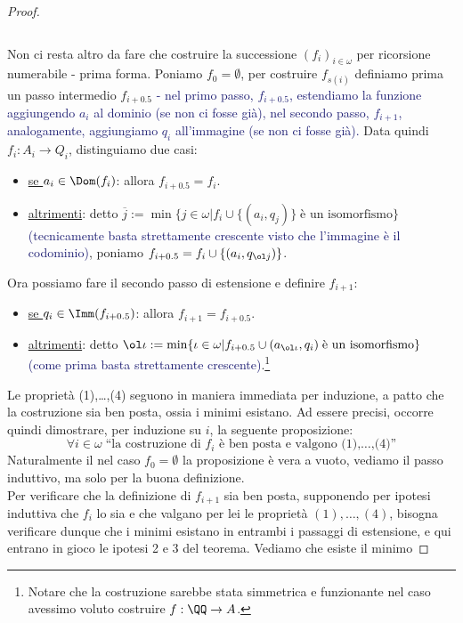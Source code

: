 \begin{proof}
\begin{itemize}
\[			\]
	\end{itemize}
	Non ci resta altro da fare che costruire la successione $(f_i)_{i \in \omega}$ per ricorsione numerabile - prima forma. Poniamo $f_0 = \emptyset$,
	per costruire $f_{s(i)}$ definiamo prima un passo intermedio $f_{i+0.5}$ \textcolor{MidnightBlue}{- nel primo passo, $f_{i + 0.5}$, estendiamo la funzione aggiungendo $a_{i}$ al dominio (se non ci fosse già), nel secondo passo, $f_{i + 1}$, analogamente, aggiungiamo $q_i$ all'immagine (se non ci fosse già).}
	Data quindi $f_i : A_i \to Q_i$, distinguiamo due casi:
	\begin{itemize}
		\item \underline{se $a_i \in \Dom(f_i)$}: allora $f_{i + 0.5} = f_i$.
		\item \underline{altrimenti}: detto $\overline{j} := \min\{j \in \omega | f_i \cup \{(a_i,q_j)\} \; \text{è un isomorfismo}\}$ \textcolor{MidnightBlue}{(tecnicamente basta strettamente crescente visto che l'immagine è il codominio)},
		poniamo $f_{i + 0.5} = f_i \cup \{(a_i,q_{\ol j})\}$.
	\end{itemize}
	Ora possiamo fare il secondo passo di estensione e definire $f_{i+1}$:
	\begin{itemize}
		\item \underline{se $q_i \in \Imm(f_{i + 0.5})$}: allora $f_{i + 1} = f_{i + 0.5}$.
		\item \underline{altrimenti}: detto $\ol \iota := \min\{\iota \in \omega | f_{i + 0.5} \cup (a_{\ol \iota},q_i) \; \text{è un isomorfismo}\}$ \textcolor{MidnightBlue}{(come prima basta strettamente crescente)}.\footnote{Notare che la costruzione sarebbe stata simmetrica e funzionante nel caso avessimo voluto costruire $f : \QQ \to A$.}
	\end{itemize}
	Le proprietà (1),\ldots,(4) seguono in maniera immediata per induzione, a patto che la costruzione sia ben posta, ossia i minimi esistano. 
	Ad essere precisi, occorre quindi dimostrare, per induzione su $i$, la seguente proposizione:
	\[ \forall i \in \omega \; \text{``la costruzione di $f_i$ è ben posta e valgono (1),\ldots,(4)''}
		\]
	Naturalmente il nel caso $f_0 = \emptyset$ la proposizione è vera a vuoto, vediamo il passo induttivo, ma solo per la buona definizione.\\
	Per verificare che la definizione di $f_{i + 1}$ sia ben posta, supponendo per ipotesi induttiva che $f_i$ lo sia e che valgano per lei le proprietà $(1),\ldots,(4)$,
	bisogna verificare dunque che i minimi esistano in entrambi i passaggi di estensione, e qui entrano in gioco le ipotesi 2 e 3 del teorema. Vediamo che esiste il minimo

\end{proof}
